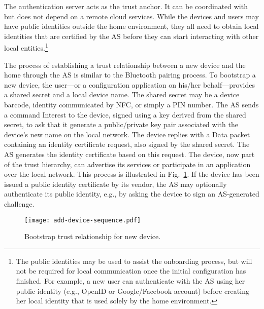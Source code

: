 The authentication server acts as the trust anchor. It can be coordinated with but does not depend on a remote cloud services.
While the devices and users may have public identities outside the home environment, they all need to obtain local identities that are certified by the AS before they can start interacting with other local entities.\footnote{The public identities may be used to assist the onboarding process, but will not be required for local communication once the initial configuration has finished.
For example, a new user can authenticate with the AS using her public identity (e.g., OpenID or Google/Facebook account) before creating her local identity that is used solely by the home environment.}

The process of establishing a trust relationship between a new device and the home through the AS is similar to the Bluetooth pairing process.
To bootstrap a new device, the user---or a configuration application on his/her behalf---provides a shared secret and a local device name.  The shared secret may be a device barcode, identity communicated by NFC, or simply a PIN number. 
The AS sends a command Interest to the device, signed using a key derived from the shared secret, to ask that it generate a public/private key pair associated with the device's new name on the local network.  The device replies with a Data packet containing an identity certificate request, also signed by the shared secret.
The AS generates the identity certificate based on this request.  The device, now part of the trust hierarchy, can advertise its services or participate in an application over the local network.
This process is illustrated in Fig.~\ref{fig:flow-bootstrap}.
If the device has been issued a public identity certificate by its vendor, the AS may optionally authenticate its public identity, e.g., by asking the device to sign an AS-generated challenge.


\begin{figure}[!t]
\centering
\texttt{[image: add-device-sequence.pdf]}
\caption{Bootstrap trust relationship for new device.}
\label{fig:flow-bootstrap}
\end{figure}

